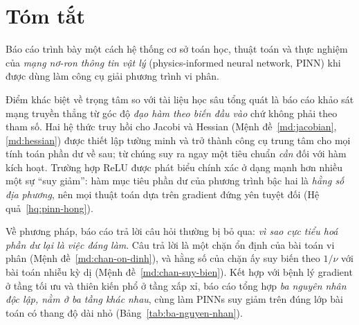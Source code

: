 
\chapter*{Tóm tắt}

Báo cáo trình bày một cách hệ thống cơ sở toán học, thuật toán và thực nghiệm
của \emph{mạng nơ-ron thông tin vật lý} (physics-informed neural network, PINN)
khi được dùng làm công cụ giải phương trình vi phân.

Điểm khác biệt về trọng tâm so với tài liệu học sâu tổng quát là báo cáo khảo
sát mạng truyền thẳng từ góc độ \emph{đạo hàm theo biến đầu vào} chứ không phải
theo tham số. Hai hệ thức truy hồi cho Jacobi và Hessian
(Mệnh đề~\ref{md:jacobian}, \ref{md:hessian}) được thiết lập tường minh và trở
thành công cụ trung tâm cho mọi tính toán phần dư về sau; từ chúng suy ra ngay
một tiêu chuẩn \emph{cần} đối với hàm kích hoạt. Trường hợp ReLU được phát biểu
chính xác ở dạng mạnh hơn nhiều một sự ``suy giảm'': hàm mục tiêu phần dư của
phương trình bậc hai là \emph{hằng số địa phương}, nên mọi thuật toán dựa trên
gradient đứng yên tuyệt đối (Hệ quả~\ref{hq:pinn-hong}).

Về phương pháp, báo cáo trả lời câu hỏi thường bị bỏ qua: \emph{vì sao cực tiểu
hoá phần dư lại là việc đáng làm}. Câu trả lời là một chặn ổn định của bài toán
vi phân (Mệnh đề~\ref{md:chan-on-dinh}), và hằng số của chặn ấy suy biến theo
$1/\nu$ với bài toán nhiễu kỳ dị (Mệnh đề~\ref{md:chan-suy-bien}). Kết hợp với
bệnh lý gradient ở tầng tối ưu và thiên kiến phổ ở tầng xấp xỉ, báo cáo tổng
hợp \emph{ba nguyên nhân độc lập, nằm ở ba tầng khác nhau}, cùng làm PINNs suy
giảm trên đúng lớp bài toán có thang độ dài nhỏ (Bảng~\ref{tab:ba-nguyen-nhan}).

